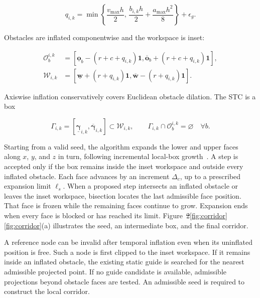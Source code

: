 \documentclass[electronics,article,submit,moreauthors]{Definitions/mdpi}
\newcommand{\one}{\mathbf{1}}
\providecommand{\DIFadd}[1]{{\protect\color{RevisionBlue}\ifmmode #1\else\uline{#1}\fi}} %
\providecommand{\DIFdel}[1]{{\protect\color{RevisionRed}\ifmmode\text{\sout{\ensuremath{#1}}}\else\sout{#1}\fi}} %
\providecommand{\DIFaddbegin}{}\providecommand{\DIFaddend}{} %
\providecommand{\DIFdelbegin}{}\providecommand{\DIFdelend}{} %
\begin{document}
\begin{equation}
 q_{i,k}=\min\left\{\frac{v_{\max}h}{2},\,
 \frac{b_{i,k}h}{2}+\frac{a_{\max}h^2}{8}\right\}+\epsilon_g.
 \label{eq:padding}
\end{equation}

Obstacles are inflated componentwise and the workspace is inset:

\begin{subequations}\label{eq:inflation}\begin{align}
 \mathcal O_b^{i,k}&=[\underline{\mathbf o}_b-(r+c+q_{i,k})\one,
 \overline{\mathbf o}_b+(r+c+q_{i,k})\one],\\
 \mathcal W_{i,k}&=[\underline{\mathbf w}+(r+q_{i,k})\one,
 \overline{\mathbf w}-(r+q_{i,k})\one].
\end{align}\end{subequations}

Axiswise inflation conservatively covers Euclidean obstacle dilation. The STC is a box

\begin{equation}
 \Gamma_{i,k}=[\underline{\boldsymbol\gamma}_{i,k},\overline{\boldsymbol\gamma}_{i,k}]
 \subset\mathcal W_{i,k},\qquad
 \Gamma_{i,k}\cap\mathcal O_b^{i,k}=\varnothing\quad\forall b.
 \label{eq:stc}
\end{equation}


Starting from a valid seed, the algorithm expands the lower and upper faces along $x$, $y$, and $z$ in turn, following incremental local-box growth~\mbox{\cite{li2022liom}}. A step is accepted only if the box remains inside the inset workspace and outside every inflated obstacle. Each face advances by an increment $\Delta_c$, up to a prescribed expansion limit $\ell_s$. When a proposed step intersects an inflated obstacle or leaves the inset workspace, bisection locates the last admissible face position. That face is frozen while the remaining faces continue to grow. Expansion ends when every face is blocked or has reached its limit. Figure~\DIFdelbegin \DIFdel{\mbox{2}}\DIFdelend \DIFaddbegin \DIFadd{\ref{fig:corridor}}\DIFaddend (a) illustrates the seed, an intermediate box, and the final corridor.

A reference node can be invalid after temporal inflation even when its uninflated position is free. Such a node is first clipped to the inset workspace. If it remains inside an inflated obstacle, the existing static guide is searched for the nearest admissible projected point. If no guide candidate is available, admissible projections beyond obstacle faces are tested. An admissible seed is required to construct the local corridor.
\end{document}
